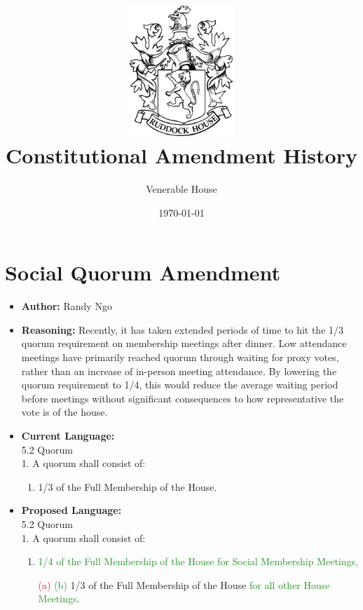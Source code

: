 \documentclass[10pt]{article} %
\title{\includegraphics[width=1.55in]{venerable_crest.png} \\ Constitutional Amendment History}
\author{Venerable House}
\date{\today} %
\begin{document}
\maketitle


\section{Social Quorum Amendment}
\begin{itemize}
    \item \textbf{Author:} Randy Ngo
    \item \textbf{Reasoning:} Recently, it has taken extended periods of time to hit the 1/3 quorum requirement on membership meetings after dinner. Low attendance meetings have primarily reached quorum through waiting for proxy votes, rather than an increase of in-person meeting attendance. By lowering the quorum requirement to 1/4, this would reduce the average waiting period before meetings without significant consequences to how representative the vote is of the house.
    
    \item \textbf{Current Language:} \\
        5.2 Quorum \\
        1. A quorum shall consist of:
        \begin{enumerate}[label=(\alph*)]
            \item 1/3 of the Full Membership of the House.
        \end{enumerate}

    \item \textbf{Proposed Language:} \\
        5.2 Quorum \\
        1. A quorum shall consist of:
        \begin{enumerate}[label=(\alph*)]
            \item \textcolor{ForestGreen}{1/4 of the Full Membership of the House for Social Membership Meetings,}
            \item[\textcolor{red}{(a)} \textcolor{ForestGreen}{(b)}] 1/3 of the Full Membership of the House \textcolor{ForestGreen}{for all other House Meetings}.
        \end{enumerate}
\end{itemize}

\newpage
\end{document}
